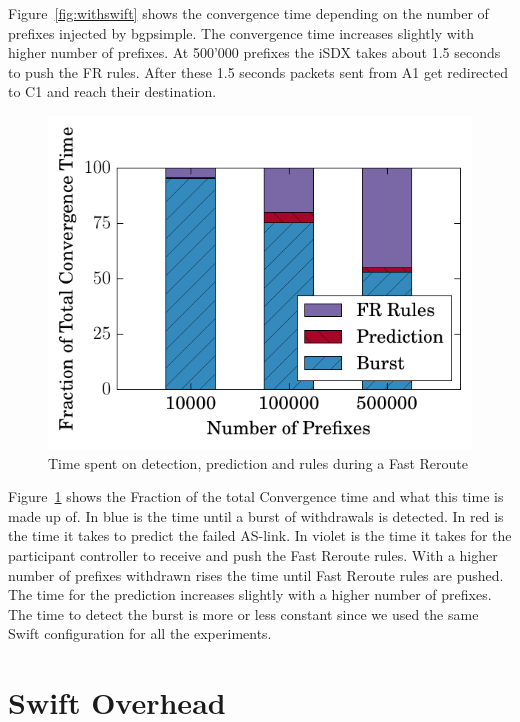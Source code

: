 Figure~\ref{fig:withswift} shows the convergence time depending on the number of prefixes injected by bgpsimple.
The convergence time increases slightly with higher number of prefixes. At 500'000 prefixes the iSDX takes about 1.5 seconds to push the FR rules. After these 1.5 seconds packets sent from A1 get redirected to C1 and reach their destination. \\

\begin{figure}[h]
\center
\includegraphics[scale = 1]{Figures/barplot.pdf}
\caption{Time spent on detection, prediction and rules during a Fast Reroute}
\label{fig:activities}
\end{figure}

Figure~\ref{fig:activities} shows the Fraction of the total Convergence time and what this time is made up of. In blue is the time until a burst of withdrawals is detected. In red is the time it takes to predict the failed AS-link. In violet is the time it takes for the participant controller to receive and push the Fast Reroute rules. With a higher number of prefixes withdrawn rises the time until Fast Reroute rules are pushed. The time for the prediction increases slightly with a higher number of prefixes. The time to detect the burst is more or less constant since we used the same Swift configuration for all the experiments. 

\section{\label{chapter4:Swift overhead}Swift Overhead}

